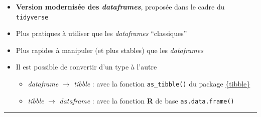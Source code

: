 \documentclass[
  french,
  10pt,
  a4paper,
]{article}
\providecommand{\tightlist}{%
  \setlength{\itemsep}{0pt}\setlength{\parskip}{0pt}}
\begin{document}
\begin{itemize}
\tightlist
\item
  \textbf{Version modernisée des \emph{dataframes}}, proposée dans le
  cadre du \texttt{tidyverse}
\item
  Plus pratiques à utiliser que les \emph{dataframes} ``classiques''
\item
  Plus rapides à manipuler (et plus stables) que les \emph{dataframes}
\item
  Il est possible de convertir d'un type à l'autre

  \begin{itemize}
  \tightlist
  \item
    \emph{dataframe} \(\rightarrow\) \emph{tibble} : avec la fonction
    \texttt{as\_tibble()} du package
    \href{https://tibble.tidyverse.org/}{\{tibble\}}\\
  \item
    \emph{tibble} \(\rightarrow\) \emph{dataframe} : avec la fonction
    \textbf{R} de base \texttt{as.data.frame()}
  \end{itemize}
\end{itemize}

\begin{center}\rule{0.5\linewidth}{0.5pt}\end{center}
\end{document}

